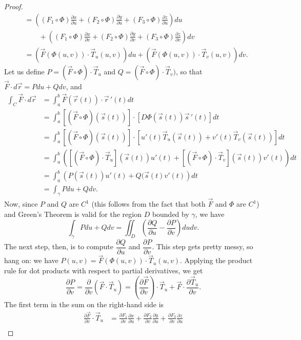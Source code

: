 \documentclass[12pt,letterpaper]{article}
\begin{document}
\begin{proof}
\begin{align*}
& = \left((F_1\circ\Phi)\frac{\partial x}{\partial u}+(F_2\circ\Phi)\frac{\partial y}{\partial u}+(F_3\circ\Phi)\frac{\partial z}{\partial u}\right)du\\
&\quad \quad+\left((F_1\circ\Phi)\frac{\partial x}{\partial v}+(F_2\circ\Phi)\frac{\partial y}{\partial v}+(F_3\circ\Phi)\frac{\partial z}{\partial v}\right)dv\\
& = \left(\vec{F}(\Phi(u,v))\cdot \vec{T}_u(u,v)\right)du + \left(\vec{F}(\Phi(u,v))\cdot \vec{T}_v(u,v)\right)dv.
\end{align*}
Let us define $P = (\vec{F}\circ\Phi)\cdot \vec{T}_u$ and $Q = (\vec{F}\circ\Phi)\cdot \vec{T}_v)$, so that $\vec{F}\cdot d\vec{r} = Pdu+Qdv$, and
\begin{align*}
 \int_C \vec{F}\cdot d\vec{r} &= \int_a^b \vec{F}(\vec{r}(t))\cdot \vec{r}\,'(t)dt\\
& = \int_a^b \left[(\vec{F}\circ\Phi)(\vec{s}(t))\right]\cdot \left[D\Phi(\vec{s}(t))\vec{s}\,'(t)\right]dt\\
& = \int_a^b \left[(\vec{F}\circ\Phi)(\vec{s}(t))\right]\cdot \left[u'(t)\vec{T}_u(\vec{s}(t))+v'(t)\vec{T}_v(\vec{s}(t))\right]dt\\
& = \int_a^b \left(\left[(\vec{F}\circ\Phi)\cdot\vec{T}_u\right](\vec{s}(t))u'(t)+\left[(\vec{F}\circ\Phi)\cdot \vec{T}_v\right](\vec{s}(t))v'(t)\right)dt\\
& = \int_a^b \left(P(\vec{s}(t))u'(t)+Q(\vec{s}(t)v'(t)\right)dt\\
& = \int_\gamma Pdu+Qdv.
\end{align*}
Now, since $P$ and $Q$ are $C^1$ (this follows from the fact that both $\vec{F}$ and $\Phi$ are $C^1$) and Green's Theorem is valid for the region $D$ bounded by $\gamma$, we have
\[
 \int_\gamma Pdu+Qdv = \iint_D\left(\frac{\partial Q}{\partial u}-\frac{\partial P}{\partial v}\right)dudv.
\]
The next step, then, is to compute $\dfrac{\partial Q}{\partial u}$ and $\dfrac{\partial P}{\partial v}$. This step gets pretty messy, so hang on: we have $P(u,v) = \vec{F}(\Phi(u,v))\cdot \vec{T}_u(u,v)$. Applying the product rule for dot products with respect to partial derivatives, we get
\[
 \frac{\partial P}{\partial v}=\frac{\partial}{\partial v}\left(\vec{F}\cdot \vec{T}_u\right) = \left(\frac{\partial \vec{F}}{\partial v}\right)\cdot \vec{T}_u+\vec{F}\cdot \frac{\partial \vec{T}_u}{\partial v}.
\]
The first term in the sum on the right-hand side is
\begin{align*}
 \frac{\partial \vec{F}}{\partial v}\cdot \vec{T}_u & = \frac{\partial F_1}{\partial v}\frac{\partial x}{\partial u}+\frac{\partial F_2}{\partial v}\frac{\partial y}{\partial u}+\frac{\partial F_3}{\partial v}\frac{\partial z}{\partial u}\\

\end{align*}
\end{proof}
\end{document}
